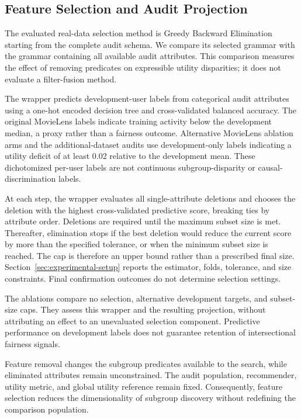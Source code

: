 \subsection{Feature Selection and Audit Projection}
\label{sec:feature-selection}
The evaluated real-data selection method is Greedy Backward Elimination starting from the complete audit schema. We compare its selected grammar with the grammar containing all available audit attributes. This comparison measures the effect of removing predicates on expressible utility disparities; it does not evaluate a filter-fusion method.

The wrapper predicts development-user labels from categorical audit attributes using a one-hot encoded decision tree and cross-validated balanced accuracy. The original MovieLens labels indicate training activity below the development median, a proxy rather than a fairness outcome. Alternative MovieLens ablation arms and the additional-dataset audits use development-only labels indicating a utility deficit of at least 0.02 relative to the development mean. These dichotomized per-user labels are not continuous subgroup-disparity or causal-discrimination labels.

At each step, the wrapper evaluates all single-attribute deletions and chooses the deletion with the highest cross-validated predictive score, breaking ties by attribute order. Deletions are required until the maximum subset size is met. Thereafter, elimination stops if the best deletion would reduce the current score by more than the specified tolerance, or when the minimum subset size is reached. The cap is therefore an upper bound rather than a prescribed final size. Section~\ref{sec:experimental-setup} reports the estimator, folds, tolerance, and size constraints. Final confirmation outcomes do not determine selection settings.

The ablations compare no selection, alternative development targets, and subset-size caps. They assess this wrapper and the resulting projection, without attributing an effect to an unevaluated selection component. Predictive performance on development labels does not guarantee retention of intersectional fairness signals.

Feature removal changes the subgroup predicates available to the search, while eliminated attributes remain unconstrained. The audit population, recommender, utility metric, and global utility reference remain fixed. Consequently, feature selection reduces the dimensionality of subgroup discovery without redefining the comparison population.

